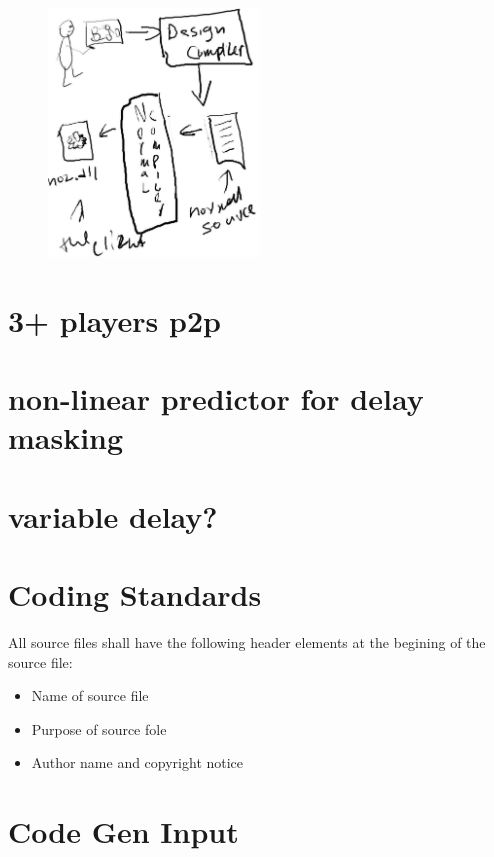 \documentclass{article}
\begin{document}
 
\begin{figure}[h]
	\centering
		\includegraphics[width=0.50\textwidth]{idea1.jpg}
	\label{fig:idea1}
\end{figure}


\section{3+ players p2p}

\section{non-linear predictor for delay masking}

\section{variable delay?}

\section{Coding Standards}
All source files shall have the following header elements at the begining of the source file:
\begin{itemize}
	\item Name of source file
	\item Purpose of source fole
	\item Author name and copyright notice
\end{itemize}

\lstset{language=C++}

\section{Code Gen Input}
\end{document}
